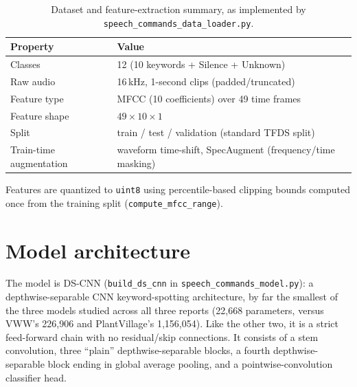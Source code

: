 \documentclass[11pt]{article}
\newcommand{\code}[1]{\texttt{#1}}
\begin{document}
\begin{table}[H]
\centering
\caption{Dataset and feature-extraction summary, as implemented by \code{speech\_commands\_data\_loader.py}.}
\label{tab:dataset}
\begin{tabular}{@{}ll@{}}
\toprule
Property & Value \\
\midrule
Classes & 12 (10 keywords + Silence + Unknown) \\
Raw audio & 16\,kHz, 1-second clips (padded/truncated) \\
Feature type & MFCC (10 coefficients) over 49 time frames \\
Feature shape & $49 \times 10 \times 1$ \\
Split & train / test / validation (standard TFDS split) \\
Train-time augmentation & waveform time-shift, SpecAugment (frequency/time masking) \\
\bottomrule
\end{tabular}
\end{table}

Features are quantized to \code{uint8} using percentile-based clipping bounds computed once from the training split (\code{compute\_mfcc\_range}).

\section{Model architecture}
\label{sec:architecture}

The model is DS-CNN (\code{build\_ds\_cnn} in \code{speech\_commands\_model.py}): a depthwise-separable CNN keyword-spotting architecture, by far the smallest of the three models studied across all three reports (22{,}668 parameters, versus VWW's 226{,}906 and PlantVillage's 1{,}156{,}054). Like the other two, it is a strict feed-forward chain with no residual/skip connections. It consists of a stem convolution, three ``plain'' depthwise-separable blocks, a fourth depthwise-separable block ending in global average pooling, and a pointwise-convolution classifier head.
\end{document}
